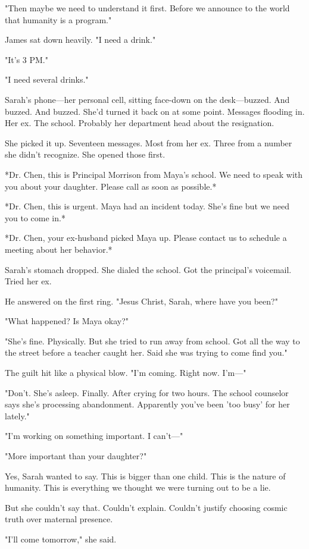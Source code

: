 "Then maybe we need to understand it first. Before we announce to the world that humanity is a program."

James sat down heavily. "I need a drink."

"It's 3 PM."

"I need several drinks."

Sarah's phone—her personal cell, sitting face-down on the desk—buzzed. And buzzed. And buzzed. She'd turned it back on at some point. Messages flooding in. Her ex. The school. Probably her department head about the resignation.

She picked it up. Seventeen messages. Most from her ex. Three from a number she didn't recognize. She opened those first.

*Dr. Chen, this is Principal Morrison from Maya's school. We need to speak with you about your daughter. Please call as soon as possible.*

*Dr. Chen, this is urgent. Maya had an incident today. She's fine but we need you to come in.*

*Dr. Chen, your ex-husband picked Maya up. Please contact us to schedule a meeting about her behavior.*

Sarah's stomach dropped. She dialed the school. Got the principal's voicemail. Tried her ex.

He answered on the first ring. "Jesus Christ, Sarah, where have you been?"

"What happened? Is Maya okay?"

"She's fine. Physically. But she tried to run away from school. Got all the way to the street before a teacher caught her. Said she was trying to come find you."

The guilt hit like a physical blow. "I'm coming. Right now. I'm—"

"Don't. She's asleep. Finally. After crying for two hours. The school counselor says she's processing abandonment. Apparently you've been 'too busy' for her lately."

"I'm working on something important. I can't—"

"More important than your daughter?"

Yes, Sarah wanted to say. This is bigger than one child. This is the nature of humanity. This is everything we thought we were turning out to be a lie.

But she couldn't say that. Couldn't explain. Couldn't justify choosing cosmic truth over maternal presence.

"I'll come tomorrow," she said.

